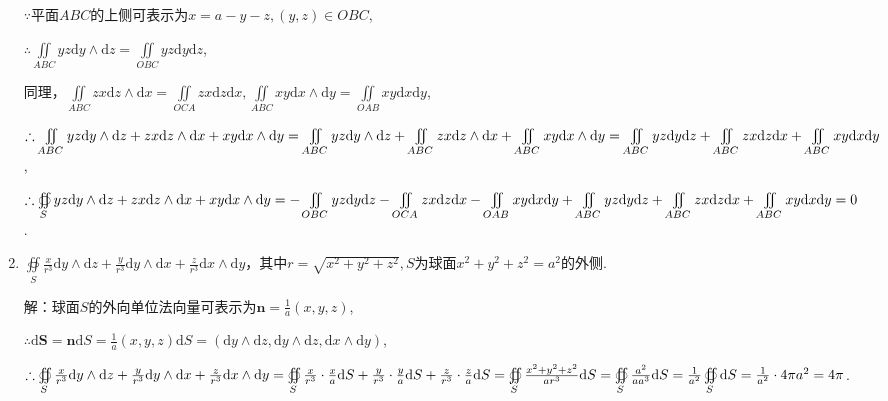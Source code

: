 \documentclass[12pt,UTF8,fleqn]{ctexart}
\newcommand{\md}[1]{\mathrm d#1}
\newcommand{\BSIInt}[2]{\iint\limits_{#1}#2}
\newcommand{\BSOIInt}[2]{\oiint\limits_{#1}#2}
\begin{document}
\begin{enumerate}
$\because$平面$ABC$的上侧可表示为$x=a-y-z,(y,z)\in OBC$,

$\therefore\BSIInt{ABC}yz\md y\wedge\md z=\BSIInt{OBC}yz\md y\md z$,

同理，$\BSIInt{ABC}zx\md z\wedge\md x=\BSIInt{OCA}zx\md z\md x,\BSIInt{ABC}xy\md x\wedge\md y=\BSIInt{OAB}xy\md x\md y$,

$\therefore\BSIInt{ABC}yz\md y\wedge\md z+zx\md z\wedge\md x+xy\md x\wedge\md y=\BSIInt{ABC}yz\md y\wedge\md z+\BSIInt{ABC}zx\md z\wedge\md x+\BSIInt{ABC}xy\md x\wedge\md y\\
=\BSIInt{ABC}yz\md y\md z+\BSIInt{ABC}zx\md z\md x+\BSIInt{ABC}xy\md x\md y$,

$\therefore\BSOIInt S{yz\md y\wedge\md z+zx\md z\wedge\md x+xy\md x\wedge\md y}=-\BSIInt{OBC}yz\md y\md z-\BSIInt{OCA}zx\md z\md x-\BSIInt{OAB}xy\md x\md y\\
+\BSIInt{ABC}yz\md y\md z+\BSIInt{ABC}zx\md z\md x+\BSIInt{ABC}xy\md x\md y\\
=0$.

\item$\BSOIInt S{\frac x{r^3}\md y\wedge\md z+\frac y{r^3}\md y\wedge\md x+\frac z{r^3}\md x\wedge\md y}$，其中$r=\sqrt{x^2+y^2+z^2},S$为球面$x^2+y^2+z^2=a^2$的外侧.

解：球面$S$的外向单位法向量可表示为$\bm n=\frac1a(x,y,z)$,

$\therefore\md\bm S=\bm n\md S=\frac1a(x,y,z)\md S=(\md y\wedge\md z,\md y\wedge\md z,\md x\wedge\md y)$,

$\therefore\BSOIInt S{\frac x{r^3}\md y\wedge\md z+\frac y{r^3}\md y\wedge\md x+\frac z{r^3}\md x\wedge\md y}=\BSOIInt S{\frac x{r^3}\cdot\frac xa\md S+\frac y{r^3}\cdot\frac ya\md S+\frac z{r^3}\cdot\frac za\md S}=\BSOIInt S{\frac{x^2+y^2+z^2}{ar^3}\md S}\\
=\BSOIInt S{\frac{a^2}{aa^3}\md S}=\frac1{a^2}\BSOIInt S{\md S}=\frac1{a^2}\cdot4\pi a^2=4\pi$.
\end{enumerate}
\end{document}

